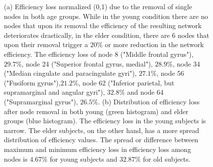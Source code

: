 \documentclass[12pt,a4paper]{article}
\begin{document}
\begin{figure}[H]
    \hfill
    \caption{\small (a) Efficiency loss normalized (0,1) due to the removal of single nodes in both age groups. While in the young condition there are no nodes that upon its removal the efficiency of the resulting network deteriorates drastically, in the elder condition, there are 6 nodes that upon their removal trigger a $20\%$ or more reduction in the network efficiency. The efficiency loss of node 8 ("Middle frontal gyrus"), $29.7\%$, node 24 ("Superior frontal gyrus, medial"), $28.9\%$, node 34 ("Median cingulate and paracingulate gyri"), $27.1\%$, node 56 ("Fusiform gyrus"),$21.2\%$, node 62 ("Inferior parietal, but supramarginal and angular gyri"), $32.8\%$ and node 64 ("Supramarginal gyrus"), $26.5\%$.   
  \small (b) Distribution of efficiency loss after node removal in both young (green histogram) and elder groups (blue histogram). The efficiency loss in the young subjects is narrow. The elder subjects, on the other hand, has a more spread distribution of efficiency values. 
The spread or difference between maximum and minimum efficiency loss in efficiency loss among nodes is $4.67\%$ for young subjects and $32.87\%$ for old subjects.}
    \label{fig:gauss}
  \end{figure} 
\end{document}
